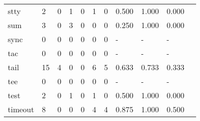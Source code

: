 \begin{longtable}{lp{1.10cm}p{1.10cm}p{1.10cm}p{1.10cm}p{1.10cm}p{1.10cm}p{1.10cm}p{1.10cm}p{1.10cm}p{1.10cm}}
stty      &                      2 &                                  0 &                                 1 &                                0 &                                 1 &                               0 &                          0.500 &                                 1.000 &                               0.000 \\
sum       &                      3 &                                  0 &                                 3 &                                0 &                                 0 &                               0 &                          0.250 &                                 1.000 &                               0.000 \\
sync      &                      0 &                                  0 &                                 0 &                                0 &                                 0 &                               0 &                              - &                                     - &                                   - \\
tac       &                      0 &                                  0 &                                 0 &                                0 &                                 0 &                               0 &                              - &                                     - &                                   - \\
tail      &                     15 &                                  4 &                                 0 &                                0 &                                 6 &                               5 &                          0.633 &                                 0.733 &                               0.333 \\
tee       &                      0 &                                  0 &                                 0 &                                0 &                                 0 &                               0 &                              - &                                     - &                                   - \\
test      &                      2 &                                  0 &                                 1 &                                0 &                                 1 &                               0 &                          0.500 &                                 1.000 &                               0.000 \\
timeout   &                      8 &                                  0 &                                 0 &                                0 &                                 4 &                               4 &                          0.875 &                                 1.000 &                               0.500 \\

\end{longtable}
